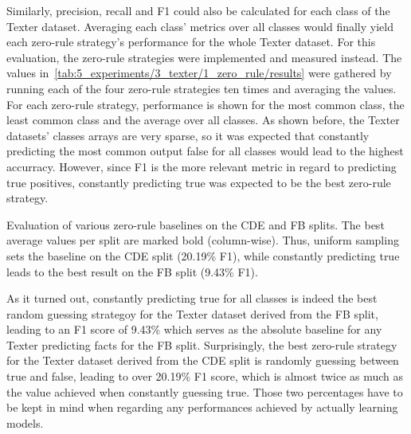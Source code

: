 Similarly, precision, recall and F1 could also be calculated for each class of the Texter dataset. Averaging each class' metrics over all classes would finally yield each zero-rule strategy's performance for the whole Texter dataset. For this evaluation, the zero-rule strategies were implemented and measured instead. The values in~\ref{tab:5_experiments/3_texter/1_zero_rule/results} were gathered by running each of the four zero-rule strategies ten times and averaging the values. For each zero-rule strategy, performance is shown for the most common class, the least common class and the average over all classes. As shown before, the Texter datasets' classes arrays are very sparse, so it was expected that constantly predicting the most common output false for all classes would lead to the highest accurracy. However, since F1 is the more relevant metric in regard to predicting true positives, constantly predicting true was expected to be the best zero-rule strategy.

\begin{table}[t]
    \makebox[\textwidth][c]{
        
    }
    \caption{Evaluation of various zero-rule baselines on the CDE and FB splits. The best average values per split are marked bold (column-wise). Thus, uniform sampling sets the baseline on the CDE split (20.19\% F1), while constantly predicting true leads to the best result on the FB split (9.43\% F1).}
    \label{tab:5_experiments/3_texter/1_zero_rule/results}
\end{table}

As it turned out, constantly predicting true for all classes is indeed the best random guessing strategoy for the Texter dataset derived from the FB split, leading to an F1 score of 9.43\% which serves as the absolute baseline for any Texter predicting facts for the FB split. Surprisingly, the best zero-rule strategy for the Texter dataset derived from the CDE split is randomly guessing between true and false, leading to over 20.19\% F1 score, which is almost twice as much as the value achieved when constantly guessing true. Those two percentages have to be kept in mind when regarding any performances achieved by actually learning models.
